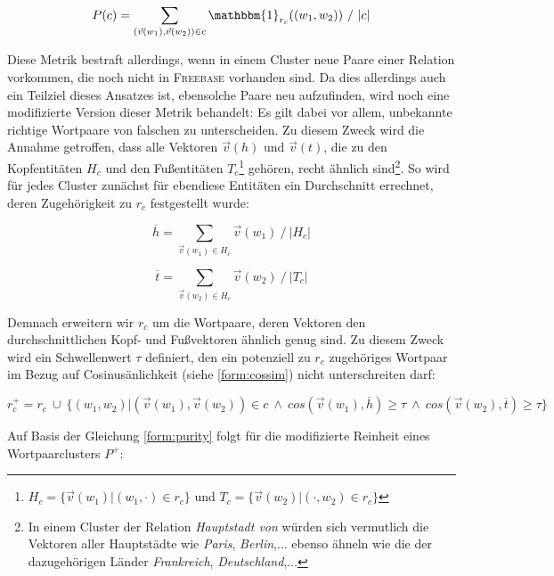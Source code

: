 \begin{equation}\label{form:purity}
    P(c) = \sum_{(\vec{v}(w_1), \vec{v}(w_2)) \in c} \mathbbm{1}_{r_c}((w_1, w_2))\ /\ |c|
\end{equation}

Diese Metrik bestraft allerdings, wenn in einem Cluster neue Paare einer Relation vorkommen, die noch nicht in \textsc{Freebase}
vorhanden sind. Da dies allerdings auch ein Teilziel dieses Ansatzes ist, ebensolche Paare neu aufzufinden, wird noch
eine modifizierte Version dieser Metrik behandelt: Es gilt dabei vor allem, unbekannte richtige Wortpaare von falschen
zu unterscheiden. Zu diesem Zweck wird die Annahme getroffen, dass alle Vektoren $\vec{v}(h)$ und $\vec{v}(t)$, die zu den Kopfentitäten $H_c$ und
den Fußentitäten $T_c$\footnote{$H_c = \{\vec{v}(w_1)|(w_1, \cdot) \in r_c\}$ und $T_c = \{\vec{v}(w_2)|(\cdot, w_2) \in r_c\}$} gehören, recht ähnlich sind\footnote{In einem Cluster der Relation \emph{Hauptstadt von} würden
sich vermutlich die Vektoren aller Hauptstädte wie \emph{Paris}, \emph{Berlin},$\ldots$ ebenso ähneln wie die der dazugehörigen
Länder \emph{Frankreich}, \emph{Deutschland},$\ldots$}. So wird für jedes Cluster zunächst für ebendiese Entitäten ein Durchschnitt
errechnet, deren Zugehörigkeit zu $r_c$ festgestellt wurde:

\begin{equation}
  \overline{h} = \sum_{\vec{v}(w_1) \in H_c} \vec{v}(w_1)\ /\ |H_c|
\end{equation}

\begin{equation}
  \overline{t} = \sum_{\vec{v}(w_2) \in H_c} \vec{v}(w_2)\ /\ |T_c|
\end{equation}

Demnach erweitern wir $r_c$ um die Wortpaare, deren Vektoren den durchschnittlichen Kopf- und Fußvektoren ähnlich genug sind.
Zu diesem Zweck wird ein Schwellenwert $\tau$ definiert, den ein potenziell zu $r_c$ zugehöriges Wortpaar im Bezug auf
Cosinusänlichkeit (siehe \ref{form:cossim}) nicht unterschreiten darf:

\begin{equation}
  r_c^+ = r_c\ \cup\ \{(w_1, w_2)| (\vec{v}(w_1), \vec{v}(w_2)) \in c\ \land\ cos(\vec{v}(w_1), \overline{h}) \geq \tau\ \land\ cos(\vec{v}(w_2), \overline{t}) \geq \tau\}
\end{equation}

Auf Basis der Gleichung \ref{form:purity} folgt für die modifizierte Reinheit eines Wortpaarclusters $P^+$:

